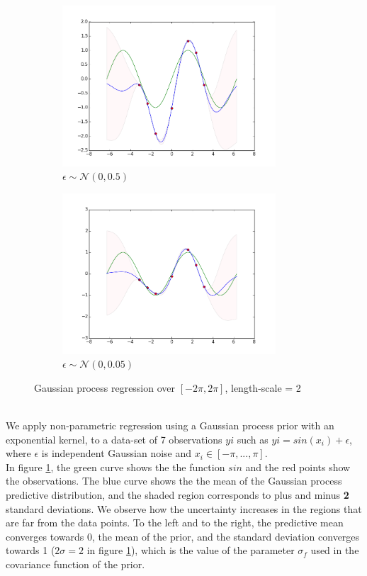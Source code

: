 \documentclass[a4paper,11pt]{article}
\theoremstyle{mytheor}
\begin{document}
\begin{figure}[h]
\begin{subfigure}{0.5\textwidth}
\includegraphics[width=\linewidth, height=6cm]{sin} 
\caption{$\epsilon \sim \mathcal{N}(0,0.5)$}
\end{subfigure}
\begin{subfigure}{0.5\textwidth}
\includegraphics[width=\linewidth, height=6cm]{sinless}
\caption{$\epsilon \sim \mathcal{N}(0,0.05)$}
\end{subfigure}
\caption{Gaussian process regression over $[-2\pi, 2\pi]$, length-scale = 2}
\label{fig:gaussreg}
\end{figure}
\hfill \\
We apply non-parametric regression using a Gaussian process prior with an exponential kernel, to a data-set of 7 observations $yi$ such as $yi = sin(x_i) + \epsilon$, where $\epsilon$ is independent Gaussian noise and $x_i \in [-\pi,...,\pi]$. \\
In figure \ref{fig:gaussreg}, the green curve shows the the function $sin$ and the red points show the observations. The blue curve shows the the mean of the Gaussian process predictive distribution, and the shaded region corresponds to plus and minus \textbf{2} standard deviations. We observe how the uncertainty increases in the regions that are far from the data points. To the left and to the right, the predictive mean converges towards 0, the mean of the prior, and the standard deviation converges towards 1 ($ 2 \sigma = 2$ in figure \ref{fig:gaussreg}), which is the value of the parameter $\sigma_f$ used in the covariance function of the prior.
\end{document}
